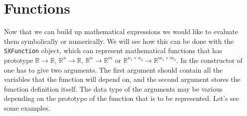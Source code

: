 \documentclass[a4paper,12pt]{book}
\begin{document}
{\section{Functions}
Now that we can build up mathematical expressions we would like to evaluate them symbolically or numerically. We will see how this can be
done with the \texttt{SXFunction} object, which can represent mathematical functions that has prototype
 $\mathbb{R} \rightarrow \mathbb{R}$, $\mathbb{R}^n \rightarrow \mathbb{R}$,
$\mathbb{R}^n \rightarrow \mathbb{R}^m $ or $\mathbb{R}^{n_1 \times n_2} \rightarrow \mathbb{R}^{m_1 \times m_2}$.
In the constructor of \texttt{} one has to give two arguments. The first argument should contain all the variables
that the function will depend on, and the second argument stores the function definition itself. The data type of the arguments may be various
depending on the prototype of the function that is to be represented. Let's see some examples.
}
\end{document}

